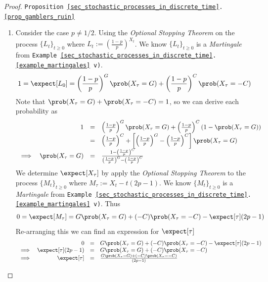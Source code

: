 \documentclass[11pt,a4paper]{article}
\begin{document}
\begin{proof}{\texttt{Proposition \ref{sec_stochastic_processes_in_discrete_time}.\ref{prop_gamblers_ruin}}}
\begin{enumerate}
        \[ 0=\expect[Z_0]=\expect[Z_\tau]=\expect[X_\tau^2-\tau] \]
        Thus, we obtain that
        \[\begin{array}{rcl}
          \expect[\tau]&=&\expect[X_\tau^2]\\
          &=&G^2\prob(X_\tau=G)+C^2\prob(X_\tau=-C)\\
          &=&G^2\frac{C}{C+G}+C^2\frac{G}{C+G}\\
          &=&CG
        \end{array}\]
        \item Consider the case $p\neq1/2$. Using the \textit{Optional Stopping Theorem} on the process $\{L_t\}_{t\geq0}$ where $L_t:=\left(\frac{1-p}p\right)^{X_t}$. We know $\{L_t\}_{t\geq0}$ is a \textit{Martingale} from \texttt{Example \ref{sec_stochastic_processes_in_discrete_time}.\ref{example_martingales} v)}.
        \[
          1=\expect[L_0]=\left(\frac{1-p}{p}\right)^G\prob(X_\tau=G)+\left(\frac{1-p}{p}\right)^C\prob(X_\tau=-C)
        \]
        Note that  $\prob(X_\tau=G)+\prob(X_\tau=-C)=1$, so we can derive each probability as
        \[\begin{array}{rrcl}
          &1&=&\left(\frac{1-p}{p}\right)^G\prob(X_\tau=G)+\left(\frac{1-p}{p}\right)^C(1-\prob(X_\tau=G))\\
          &&=&\left(\frac{1-p}{p}\right)^C+\left[\left(\frac{1-p}{p}\right)^G-\left(\frac{1-p}{p}\right)^C\right]\prob(X_\tau=G)\\
          \implies&\prob(X_\tau=G)&=&\frac{1-\left(\frac{1-p}{p}\right)^C}{\left(\frac{1-p}{p}\right)^G-\left(\frac{1-p}{p}\right)^C}
        \end{array}\]
        We determine $\expect[X_\tau]$ by apply the \textit{Optional Stopping Theorem} to the process $\{M_t\}_{t\geq0}$ where $M_\tau:=X_t-t(2p-1)$. We know $\{M_t\}_{t\geq0}$ is a \textit{Martingale} from \texttt{Example \ref{sec_stochastic_processes_in_discrete_time}.\ref{example_martingales} v)}. Thus
        \[ 0=\expect[M_\tau]=G\prob(X_\tau=G)+(-C)\prob(X_\tau=-C)-\expect[\tau](2p-1) \]
        Re-arranging this we can find an expression for $\expect[\tau]$
        \[\begin{array}{rrcl}
          &0&=&G\prob(X_\tau=G)+(-C)\prob(X_\tau=-C)-\expect[\tau](2p-1)\\
          \implies&\expect[\tau](2p-1)&=&G\prob(X_\tau=G)+(-C)\prob(X_\tau=-C)\\
          \implies&\expect[\tau]&=&\frac{G\prob(X_\tau=G)+(-C)\prob(X_\tau=-C)}{(2p-1)}\\
        \end{array}\]
      \end{enumerate}
      \proved
    \end{proof}
\end{document}
